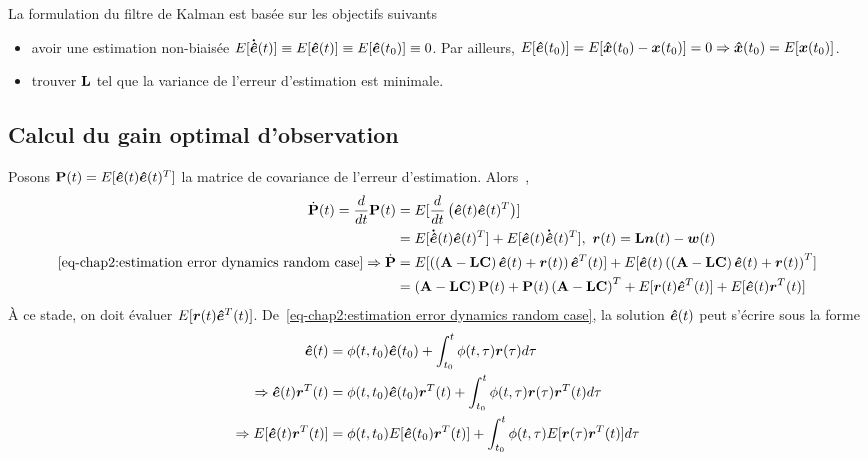 La formulation du filtre de Kalman est basée sur les objectifs suivants 
 \begin{itemize}
 	\item avoir une estimation non-biaisée $E[\bm{\dot{\hat{e}}}(t)]\equiv E[\bm{\hat{e}}(t)] \equiv E[\bm{\hat{e}}(t_0)]\equiv0$. Par ailleurs,  $E[\bm{\hat{e}}(t_0)]=E[\bm{\hat{x}}(t_0) - \bm{x}(t_0)]=0 \Rightarrow\bm{\hat{x}}(t_0)=E[\bm{x}(t_0)]$.
 	\item trouver $\mathbf{L}$ tel que la variance de l'erreur d'estimation est minimale.
 \end{itemize}
\subsection{Calcul du gain optimal d'observation}
Posons $\mathbf{P}(t)=E[\bm{\hat{e}}(t)\bm{\hat{e}}(t)^T]$ la matrice de covariance de l'erreur d'estimation. Alors~\cite{athans1967tac},
\begin{align}\label{eq-chap2:covariance matrix derivative}
	\begin{split}
		\dot{\mathbf{P}}(t)=\frac{d}{dt}\mathbf{P}(t)&=E[\frac{d}{dt}\left(\bm{\hat{e}}(t)\bm{\hat{e}}(t)^T\right)] \\	
		&=E[\bm{\dot{\hat{e}}}(t)\bm{\hat{e}}(t)^T] + E[\bm{\hat{e}}(t)\bm{\dot{\hat{e}}}(t)^T], \ \bm{r}(t) =\mathbf{L}\bm{n}(t)-\bm{w} 	(t) \\
		\eqref{eq-chap2:estimation error dynamics random case} \Rightarrow 	\dot{\mathbf{P}} &= E[\left(\left(\mathbf{A}-\mathbf{L}\mathbf{C}\right)\bm{\hat{e}}(t) + \bm{r}(t)\right)\bm{\hat{e}}^T(t)]+E[\bm{\hat{e}}(t)\left(\left(\mathbf{A}-\mathbf{L}\mathbf{C}\right)\bm{\hat{e}}(t) + \bm{r}(t)\right)^T]\\
		&=\left(\mathbf{A}-\mathbf{L}\mathbf{C}\right)\mathbf{P}(t) + \mathbf{P}(t)\left(\mathbf{A}-\mathbf{L}\mathbf{C}\right)^T+ E[\bm{r}(t)\bm{\hat{e}}^T(t)] + E[\bm{\hat{e}}(t)\bm{r}^T(t)]
	\end{split}	
\end{align}
À ce stade, on doit évaluer $E[\bm{r}(t)\bm{\hat{e}}^T(t)]$.
De~\eqref{eq-chap2:estimation error dynamics random case}, la solution $\bm{\hat{e}}(t)$ peut s'écrire sous la forme 
\begin{align}
	\begin{split}
		\bm{\hat{e}}(t) &= \phi(t,t_0)\bm{\hat{e}}(t_0)+\int_{t_0}^{t}\phi(t,\tau)\bm{r}(\tau)d\tau \\
		\Rightarrow \bm{\hat{e}}(t)\bm{r}^T(t) &= \phi(t,t_0)\bm{\hat{e}}(t_0)\bm{r}^T(t)+\int_{t_0}^{t}\phi(t,\tau)\bm{r}(\tau)\bm{r}^T(t)d\tau\\
		\Rightarrow E[\bm{\hat{e}}(t)\bm{r}^T(t)] &=\phi(t,t_0)E[\bm{\hat{e}}(t_0)\bm{r}^T(t)] + \int_{t_0}^{t}\phi(t,\tau)E[\bm{r}(\tau)\bm{r}^T(t)]d\tau
	\end{split}
\end{align}
